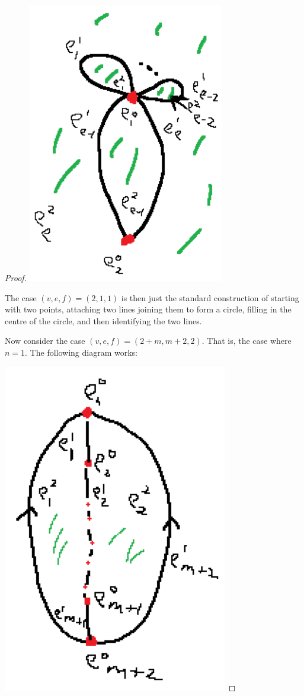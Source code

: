 \documentclass{article}
\begin{document}
\begin{proof}
\includegraphics[scale=0.5]{Screenshot (1341).png}

The case $(v,e,f)=(2,1,1)$ is then just the standard construction of starting with two points, attaching two lines joining them to form a circle, filling in the centre of the circle, and then identifying the two lines.

Now consider the case $(v,e,f)=(2+m,m+2,2)$. That is, the case where $n=1$. The following diagram works:

\includegraphics[scale=0.5]{Screenshot (1342).png}


\end{proof}
\end{document}
